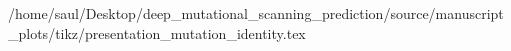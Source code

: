 /home/saul/Desktop/deep_mutational_scanning_prediction/source/manuscript_plots/tikz/presentation_mutation_identity.tex